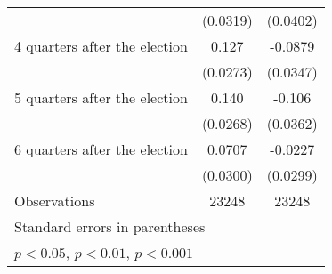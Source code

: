 \begin{table}[htbp]
\begin{tabular}{l*{2}{c}}
                    &    (0.0319)         &    (0.0402)         \\
[1em]
 4 quarters after the election&       0.127\sym{***}&     -0.0879\sym{*}  \\
                    &    (0.0273)         &    (0.0347)         \\
[1em]
 5 quarters after the election&       0.140\sym{***}&      -0.106\sym{**} \\
                    &    (0.0268)         &    (0.0362)         \\
[1em]
 6 quarters after the election&      0.0707\sym{*}  &     -0.0227         \\
                    &    (0.0300)         &    (0.0299)         \\
\hline
Observations        &       23248         &       23248         \\
\hline\hline
\multicolumn{3}{l}{\footnotesize Standard errors in parentheses}\\
\multicolumn{3}{l}{\footnotesize \sym{*} \(p<0.05\), \sym{**} \(p<0.01\), \sym{***} \(p<0.001\)}\\
\end{tabular}
\end{table}
